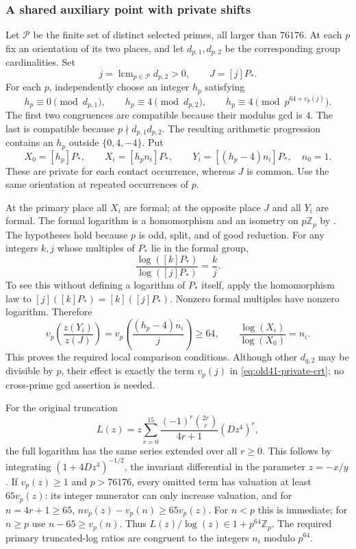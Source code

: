 \documentclass[11pt]{article}
\theoremstyle{definition}
\theoremstyle{remark}
\begin{document}
\subsubsection{A shared auxiliary point with private shifts}\label{subsec:o8-common-J-proof}
Let $\mathcal P$ be the finite set of distinct selected primes, all
larger than $76176$. At each $p$ fix an orientation of its two places,
and let $d_{p,1},d_{p,2}$ be the corresponding group cardinalities.
Set
\[
 j=\operatorname{lcm}_{p\in\mathcal P}d_{p,2}>0,
 \qquad J=[j]P_*.
\]
For each $p$, independently choose an integer $h_p$ satisfying
\begin{equation}\label{eq:old41-private-crt}
 h_p\equiv0\pmod{d_{p,1}},\qquad
 h_p\equiv4\pmod{d_{p,2}},\qquad
 h_p\equiv4\pmod{p^{64+v_p(j)}}.
\end{equation}
The first two congruences are compatible because their modulus gcd
is $4$. The last is compatible because $p\nmid d_{p,1}d_{p,2}$.
The resulting arithmetic progression contains an $h_p$ outside
$\{0,4,-4\}$. Put
\[
 X_0=[h_p]P_*,\qquad X_i=[h_p n_i]P_*,\qquad
 Y_i=[(h_p-4)n_i]P_*,\quad n_0=1.
\]
These are private for each contact occurrence, whereas $J$ is common.
Use the same orientation at repeated occurrences of $p$.

At the primary place all $X_i$ are formal; at the opposite place
$J$ and all $Y_i$ are formal. The formal logarithm is a homomorphism
and an isometry on $p\mathbb Z_p$ by
\cite[IV.6.4 and its proof; VII.2.1--2.2]{silverman}. The hypotheses hold
because $p$ is odd, split, and of good reduction. For any integers
$k,j$ whose multiples of $P_*$ lie in the formal group,
\[
 \frac{\log([k]P_*)}{\log([j]P_*)}=\frac{k}{j}.
\]
To see this without defining a logarithm of $P_*$ itself, apply the
homomorphism law to $[j]([k]P_*)=[k]([j]P_*)$. Nonzero formal
multiples have nonzero logarithm. Therefore
\[
 v_p\left(\frac{z(Y_i)}{z(J)}\right)
 =v_p\left(\frac{(h_p-4)n_i}{j}\right)\ge64,
 \qquad
 \frac{\log(X_i)}{\log(X_0)}=n_i.
\]
This proves the required local comparison conditions. Although other
$d_{q,2}$ may be divisible by $p$, their effect is exactly the term
$v_p(j)$ in \eqref{eq:old41-private-crt}; no cross-prime gcd assertion
is needed.

For the original truncation
\[
 L(z)=z\sum_{r=0}^{15}\frac{(-1)^r\binom{2r}{r}}{4r+1}(Dz^4)^r,
\]
the full logarithm has the same series extended over all $r\ge0$.
This follows by integrating
$(1+4Dz^4)^{-1/2}$, the invariant differential in the parameter
$z=-x/y$. If $v_p(z)\ge1$ and $p>76176$, every omitted term has
valuation at least $65v_p(z)$: its integer numerator can only increase
valuation, and for $n=4r+1\ge65$,
$n v_p(z)-v_p(n)\ge65v_p(z)$.
For $n<p$ this is immediate; for $n\ge p$ use $n-65\ge v_p(n)$.
Thus $L(z)/\log(z)\in1+p^{64}\mathbb Z_p$. The required primary
truncated-log ratios are congruent to the integers $n_i$ modulo $p^{64}$.
\end{document}
